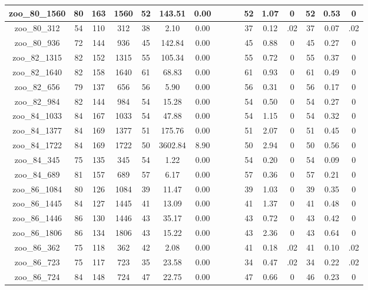 \begin{landscape}
\begin{longtable}{|c|c|c|c|c|c|c|c|c|c|c|c|c|c|c|c|}
zoo\_80\_1560 & 80 & 163 & 1560 & 52 & 143.51 & 0.00 &  &  &  & 52 & 1.07 & 0 & 52 & 0.53 & 0 \\ \hline 
zoo\_80\_312 & 54 & 110 & 312 & 38 & 2.10 & 0.00 &  &  &  & 37 & 0.12 & .02 & 37 & 0.07 & .02 \\ \hline 
zoo\_80\_936 & 72 & 144 & 936 & 45 & 142.84 & 0.00 &  &  &  & 45 & 0.88 & 0 & 45 & 0.27 & 0 \\ \hline 
zoo\_82\_1315 & 82 & 152 & 1315 & 55 & 105.34 & 0.00 &  &  &  & 55 & 0.72 & 0 & 55 & 0.37 & 0 \\ \hline 
zoo\_82\_1640 & 82 & 158 & 1640 & 61 & 68.83 & 0.00 &  &  &  & 61 & 0.93 & 0 & 61 & 0.49 & 0 \\ \hline 
zoo\_82\_656 & 79 & 137 & 656 & 56 & 5.90 & 0.00 &  &  &  & 56 & 0.31 & 0 & 56 & 0.17 & 0 \\ \hline 
zoo\_82\_984 & 82 & 144 & 984 & 54 & 15.28 & 0.00 &  &  &  & 54 & 0.50 & 0 & 54 & 0.27 & 0 \\ \hline 
zoo\_84\_1033 & 84 & 167 & 1033 & 54 & 47.88 & 0.00 &  &  &  & 54 & 1.15 & 0 & 54 & 0.32 & 0 \\ \hline 
zoo\_84\_1377 & 84 & 169 & 1377 & 51 & 175.76 & 0.00 &  &  &  & 51 & 2.07 & 0 & 51 & 0.45 & 0 \\ \hline 
zoo\_84\_1722 & 84 & 169 & 1722 & 50 & 3602.84 & 8.90 &  &  &  & 50 & 2.94 & 0 & 50 & 0.56 & 0 \\ \hline 
zoo\_84\_345 & 75 & 135 & 345 & 54 & 1.22 & 0.00 &  &  &  & 54 & 0.20 & 0 & 54 & 0.09 & 0 \\ \hline 
zoo\_84\_689 & 81 & 157 & 689 & 57 & 6.17 & 0.00 &  &  &  & 57 & 0.36 & 0 & 57 & 0.21 & 0 \\ \hline 
zoo\_86\_1084 & 80 & 126 & 1084 & 39 & 11.47 & 0.00 &  &  &  & 39 & 1.03 & 0 & 39 & 0.35 & 0 \\ \hline 
zoo\_86\_1445 & 84 & 127 & 1445 & 41 & 13.09 & 0.00 &  &  &  & 41 & 1.37 & 0 & 41 & 0.48 & 0 \\ \hline 
zoo\_86\_1446 & 86 & 130 & 1446 & 43 & 35.17 & 0.00 &  &  &  & 43 & 0.72 & 0 & 43 & 0.42 & 0 \\ \hline 
zoo\_86\_1806 & 86 & 134 & 1806 & 43 & 15.22 & 0.00 &  &  &  & 43 & 2.36 & 0 & 43 & 0.64 & 0 \\ \hline 
zoo\_86\_362 & 75 & 118 & 362 & 42 & 2.08 & 0.00 &  &  &  & 41 & 0.18 & .02 & 41 & 0.10 & .02 \\ \hline 
zoo\_86\_723 & 75 & 117 & 723 & 35 & 23.58 & 0.00 &  &  &  & 34 & 0.47 & .02 & 34 & 0.22 & .02 \\ \hline 
zoo\_86\_724 & 84 & 148 & 724 & 47 & 22.75 & 0.00 &  &  &  & 47 & 0.66 & 0 & 46 & 0.23 & 0 \\ \hline 

\end{longtable}
\end{landscape}
